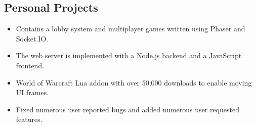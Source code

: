 \documentclass[letterpaper]{resume}
\begin{document}
\begin{minipage}[t]{0.74\columnwidth}
\sectionspace

\subsection{Personal Projects}
\vspace{2pt}
\begin{itemize}
\item Contains a lobby system and multiplayer games written using Phaser and Socket.IO.
\item The web server is implemented with a Node.js backend and a JavaScript frontend.
\end{itemize}
\vspace{3pt}
\vspace{2pt}
\begin{itemize}
\item World of Warcraft Lua addon with over 50,000 downloads to enable moving UI frames.
\item Fixed numerous user reported bugs and added numerous user requested features.
\end{itemize}

\sectionspace

\end{minipage}
\end{document}
